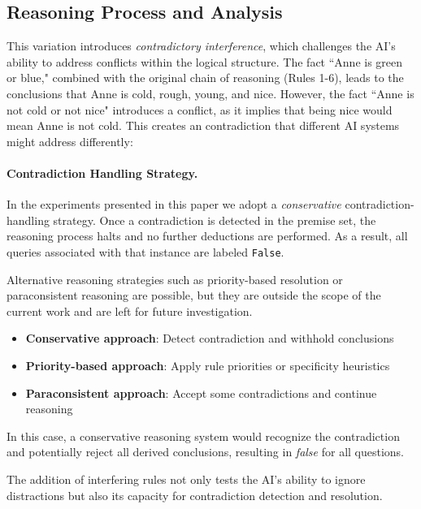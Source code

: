 \documentclass{article} %
\begin{document}
\subsection{Reasoning Process and Analysis}

    This variation introduces \textit{contradictory interference}, which challenges the AI’s ability to address conflicts within the logical structure. The fact ``Anne is green or blue," combined with the original chain of reasoning (Rules 1-6), leads to the conclusions that Anne is cold, rough, young, and nice. However, the fact ``Anne is not cold or not nice" introduces a conflict, as it implies that being nice would mean Anne is not cold. This creates an contradiction that different AI systems might address differently:

\paragraph{Contradiction Handling Strategy.}

In the experiments presented in this paper we adopt a \textit{conservative}
contradiction-handling strategy. Once a contradiction is detected in the
premise set, the reasoning process halts and no further deductions are
performed. As a result, all queries associated with that instance are
labeled \texttt{False}.

Alternative reasoning strategies such as priority-based resolution or
paraconsistent reasoning are possible, but they are outside the scope
of the current work and are left for future investigation.

\begin{itemize}
    \item \textbf{Conservative approach}: Detect contradiction and withhold conclusions
    \item \textbf{Priority-based approach}: Apply rule priorities or specificity heuristics
    \item \textbf{Paraconsistent approach}: Accept some contradictions and continue reasoning
\end{itemize}

In this case, a conservative reasoning system would recognize the contradiction and potentially reject all derived conclusions, resulting in \textit{false} for all questions.

 The addition of interfering rules not only tests the AI's ability to ignore distractions but also its capacity for contradiction detection and resolution.
\end{document}

